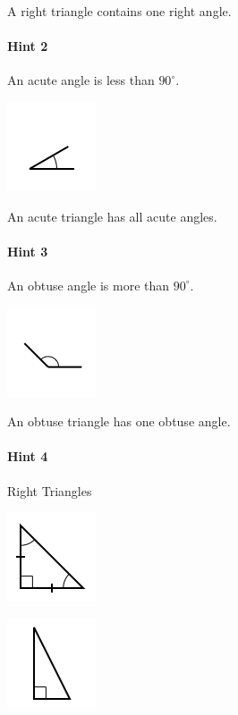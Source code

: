 \documentclass[twocolumn,10pt]{article}
\def\shrinkfactor{0.55}
\begin{document}
A right triangle contains one right angle.

\paragraph{Hint 2}An acute angle is less than $90 ^\circ$.

\includegraphics[scale=\shrinkfactor]{figures/d3a2a4fb2274b18d8b340c80127ae99c1ed8b1f9.png}

An acute triangle has all acute angles.

\paragraph{Hint 3}An obtuse angle is more than $90 ^\circ$.

\includegraphics[scale=\shrinkfactor]{figures/3b29cb7bd47c46eb2ecd140dd305d1123b9185e6.png}

An obtuse triangle has one obtuse angle.

\paragraph{Hint 4}Right Triangles


\includegraphics[scale=\shrinkfactor]{figures/8837c2c90c5edbd24cdce3fa7e110370dd5dcdef.png}

\includegraphics[scale=\shrinkfactor]{figures/ac56df552ee790942f862b76d637a69c2180f1d4.png}
\end{document}
